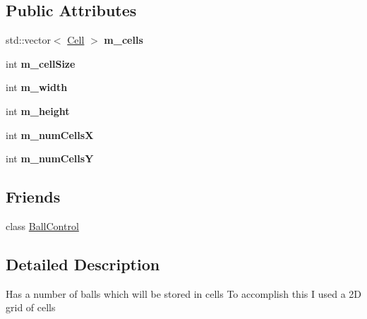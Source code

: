 \subsection*{Public Attributes}
\begin{DoxyCompactItemize}
\item 
\hypertarget{classBallGrid_a1784f4acd2d7dda8cf47b52ff9869416}{
std::vector$<$ \hyperlink{structCell}{Cell} $>$ {\bfseries m\_\-cells}}
\label{classBallGrid_a1784f4acd2d7dda8cf47b52ff9869416}

\item 
\hypertarget{classBallGrid_a27151691c66dab33adb36622089294c0}{
int {\bfseries m\_\-cellSize}}
\label{classBallGrid_a27151691c66dab33adb36622089294c0}

\item 
\hypertarget{classBallGrid_a0b9fc1fe2f4465113fcf968523a7f8ae}{
int {\bfseries m\_\-width}}
\label{classBallGrid_a0b9fc1fe2f4465113fcf968523a7f8ae}

\item 
\hypertarget{classBallGrid_ada7cfe8e209b93cca5329b048b1dc0a3}{
int {\bfseries m\_\-height}}
\label{classBallGrid_ada7cfe8e209b93cca5329b048b1dc0a3}

\item 
\hypertarget{classBallGrid_afa477104004a39645546c48c8fe891b6}{
int {\bfseries m\_\-numCellsX}}
\label{classBallGrid_afa477104004a39645546c48c8fe891b6}

\item 
\hypertarget{classBallGrid_a47e202910b6408d75837fa8f9e99e82a}{
int {\bfseries m\_\-numCellsY}}
\label{classBallGrid_a47e202910b6408d75837fa8f9e99e82a}

\end{DoxyCompactItemize}
\subsection*{Friends}
\begin{DoxyCompactItemize}
\item 
\hypertarget{classBallGrid_a96c3892ebe4274ff47fade92c0bf313f}{
class \hyperlink{classBallGrid_a96c3892ebe4274ff47fade92c0bf313f}{BallControl}}
\label{classBallGrid_a96c3892ebe4274ff47fade92c0bf313f}

\end{DoxyCompactItemize}


\subsection{Detailed Description}
Has a number of balls which will be stored in cells To accomplish this I used a 2D grid of cells 

